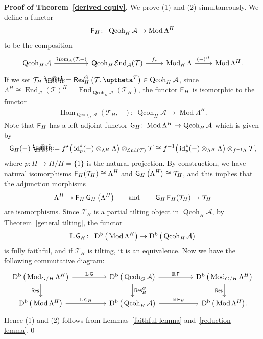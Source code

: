 \documentclass[10pt,a4paper]{amsart}
\makeatletter
\newcommand*{\defeq}{\mathrel{\rlap{%
 \raisebox{0.3ex}{$\m@th\cdot$}}%
 \raisebox{-0.3ex}{$\m@th\cdot$}}%
 =}
\numberwithin{equation}{section}
\newcommand{\Hom}{\operatorname{Hom}}
\newcommand{\cHom}{\operatorname{{\mathcal H}om}}
\newcommand{\End}{\operatorname{End}}
\newcommand{\cEnd}{\operatorname{{\mathcal E}nd}}
\newcommand{\Qcoh}{\operatorname{Qcoh}}
\newcommand{\Mod}{\operatorname{Mod}}
\newcommand{\Db}{\operatorname{D^b}}
\newcommand{\id}{\operatorname{id}}
\newcommand{\Res}{\operatorname{\sf Res}}
\newcommand{\cA}{\mathcal{A}}
\newcommand{\cT}{\mathcal{T}}
\newcommand{\bL}{\mathbb{L}}
\newcommand{\bR}{\mathbb{R}}
\newcommand{\F}{\operatorname{\sf{F}}}
\newcommand{\G}{\operatorname{\sf{G}}}
\makeatother
\begin{document}
\noindent
{\bf Proof of Theorem~\ref{derived equiv}.}
We prove (1) and (2) simultaneously. We define a functor
\begin{gather*}
\F_H\colon\ \Qcoh_H\cA\to \Mod\Lambda^H
\end{gather*}
to be the composition
\[
\begin{tikzcd}
\Qcoh_H\cA\arrow[rr,"\cHom_{\cA}(\cT\mbox{\hspace{-0.5mm}\tiny ,}-)"]&&\Qcoh_H\cEnd_{\cA}(\cT)\arrow[r,"f_{\star}"]&\Mod_H\Lambda\arrow[r,"(-)^H"]&\Mod\Lambda^H.
\end{tikzcd}
\]
If we set $\cT_H\defeq\Res^G_H\big(\cT,\uptheta^{\cT}\big)\in \Qcoh_H\cA$, since $\Lambda^H\cong \End_{\cA}(\cT)^H=\End_{\Qcoh_H\cA}(\cT_H)$, the functor $\F_H$ is isomorphic to the functor
\begin{gather*}
\Hom_{\Qcoh_H\cA}(\cT_H,-)\colon\ \Qcoh_H\cA\to \Mod\Lambda^H.
\end{gather*}
Note that $\F_H$ has a left adjoint functor $\G_H\colon \Mod\Lambda^H\to \Qcoh_H\cA$ which is given by
\begin{gather*}
\G_H(-)\defeq f^{\star}\big(\id_p^*(-)\otimes_{\Lambda^H}\Lambda\big)\otimes_{\cEnd(\cT)}\cT\cong f^{-1}\big(\id_p^*(-)\otimes_{\Lambda^H}\Lambda\big)\otimes_{f^{-1}\Lambda}\cT,
\end{gather*}
where $p\colon H\to H/H=\{1\}$ is the natural projection. By construction, we have natural isomorphisms $\F_H(\cT_H)\cong \Lambda^H$ and $\G_H\big(\Lambda^H\big)\cong \cT_H$, and this implies that the adjunction morphisms
\begin{gather*}
\Lambda^H\to \F_H\G_H\big(\Lambda^H\big) \qquad\text{and}\qquad \G_H\F_H(\cT_H)\to \cT_H
\end{gather*}
are isomorphisms.
Since $\cT_H$ is a partial tilting object in $\Qcoh_H\cA$, by Theorem~\ref{general tilting}, the functor
\begin{gather*}
\bL\G_H\colon\ \Db\big(\Mod\Lambda^H\big)\to \Db\big(\Qcoh_H\cA\big)
\end{gather*}
is fully faithful, and if $\cT_H$ is tilting, it is an equivalence.
Now we have the following commutative diagram:
\[
\begin{tikzcd}
\Db\big(\Mod_{G/H}\Lambda^H\big)\arrow[rr,"\bL\G"]\arrow[d, "\Res"']&&\Db\big(\Qcoh_G\cA\big)\arrow[d, "\Res^G_H"]\arrow[rr,"\bR\F"]&&\Db\big(\Mod_{G/H}\Lambda^H\big)\arrow[d, "\Res"']\\
\Db\big(\Mod\Lambda^H\big)\arrow[rr, "\bL \G_H"]&&\Db\big(\Qcoh_H\cA\big)\arrow[rr, "\bR \F_H"]&&\Db\big(\Mod\Lambda^H\big).
\end{tikzcd}
\]
Hence (1) and (2) follows from Lemmas~\ref{faithful lemma} and~\ref{reduction lemma}.\qed
\end{document}
